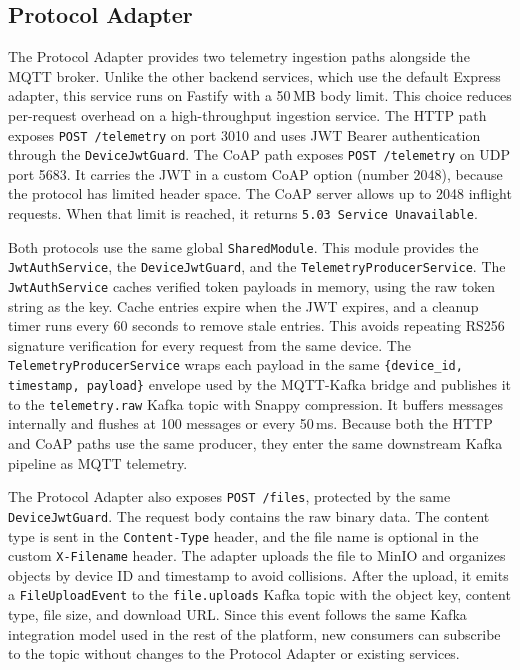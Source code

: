 \subsection{Protocol Adapter}
\label{subsec:ProtocolAdapterImpl}

The Protocol Adapter provides two telemetry ingestion paths alongside the \gls{MQTT} broker. Unlike the other backend services, which use the default Express adapter, this service runs on Fastify with a 50\,MB body limit. This choice reduces per-request overhead on a high-throughput ingestion service. The \gls{HTTP} path exposes \texttt{POST /telemetry} on port 3010 and uses \gls{JWT} Bearer authentication through the \texttt{DeviceJwtGuard}. The \gls{CoAP} path exposes \texttt{POST /telemetry} on \gls{UDP} port 5683. It carries the \gls{JWT} in a custom \gls{CoAP} option (number 2048), because the protocol has limited header space. The \gls{CoAP} server allows up to 2048 inflight requests. When that limit is reached, it returns \texttt{5.03 Service Unavailable}.

Both protocols use the same global \texttt{SharedModule}. This module provides the \texttt{JwtAuthService}, the \texttt{DeviceJwtGuard}, and the \texttt{TelemetryProducerService}. The \texttt{JwtAuthService} caches verified token payloads in memory, using the raw token string as the key. Cache entries expire when the \gls{JWT} expires, and a cleanup timer runs every 60 seconds to remove stale entries. This avoids repeating RS256 signature verification for every request from the same device. The \texttt{TelemetryProducerService} wraps each payload in the same \texttt{\{device\_id, timestamp, payload\}} envelope used by the \gls{MQTT}-Kafka bridge and publishes it to the \texttt{telemetry.raw} Kafka topic with Snappy compression. It buffers messages internally and flushes at 100 messages or every 50\,ms. Because both the \gls{HTTP} and \gls{CoAP} paths use the same producer, they enter the same downstream Kafka pipeline as \gls{MQTT} telemetry.

The Protocol Adapter also exposes \texttt{POST /files}, protected by the same \texttt{DeviceJwtGuard}. The request body contains the raw binary data. The content type is sent in the \texttt{Content-Type} header, and the file name is optional in the custom \texttt{X-Filename} header. The adapter uploads the file to MinIO and organizes objects by device \gls{ID} and timestamp to avoid collisions. After the upload, it emits a \texttt{FileUploadEvent} to the \texttt{file.uploads} Kafka topic with the object key, content type, file size, and download \gls{URL}. Since this event follows the same Kafka integration model used in the rest of the platform, new consumers can subscribe to the topic without changes to the Protocol Adapter or existing services.

